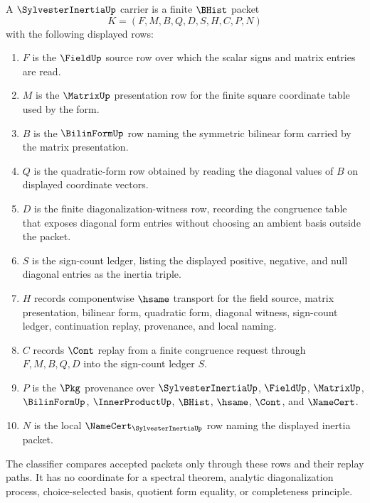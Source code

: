 \begin{definition}
\label{def:sylvester-inertia-carrier}
A $\SylvesterInertiaUp$ carrier is a finite $\BHist$ packet
$$
K=(F,M,B,Q,D,S,H,C,P,N)
$$
with the following displayed rows:
\begin{enumerate}
\item $F$ is the $\FieldUp$ source row over which the scalar signs and matrix entries are read.
\item $M$ is the $\MatrixUp$ presentation row for the finite square coordinate table used by the form.
\item $B$ is the $\BilinFormUp$ row naming the symmetric bilinear form carried by the matrix presentation.
\item $Q$ is the quadratic-form row obtained by reading the diagonal values of $B$ on displayed coordinate vectors.
\item $D$ is the finite diagonalization-witness row, recording the congruence table that exposes diagonal form entries without choosing an ambient basis outside the packet.
\item $S$ is the sign-count ledger, listing the displayed positive, negative, and null diagonal entries as the inertia triple.
\item $H$ records componentwise $\hsame$ transport for the field source, matrix presentation, bilinear form, quadratic form, diagonal witness, sign-count ledger, continuation replay, provenance, and local naming.
\item $C$ records $\Cont$ replay from a finite congruence request through $F,M,B,Q,D$ into the sign-count ledger $S$.
\item $P$ is the $\Pkg$ provenance over $\SylvesterInertiaUp$, $\FieldUp$, $\MatrixUp$, $\BilinFormUp$, $\InnerProductUp$, $\BHist$, $\hsame$, $\Cont$, and $\NameCert$.
\item $N$ is the local $\NameCert_{\SylvesterInertiaUp}$ row naming the displayed inertia packet.
\end{enumerate}
The classifier compares accepted packets only through these rows and their replay paths. It has no coordinate for a spectral theorem, analytic diagonalization process, choice-selected basis, quotient form equality, or completeness principle.
\end{definition}

